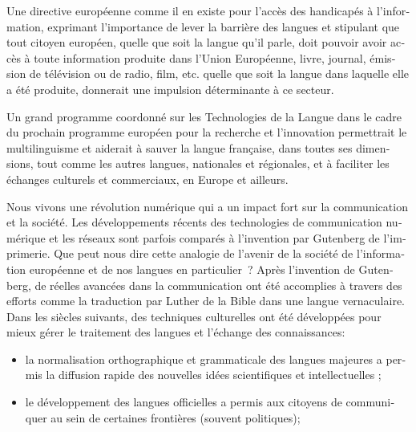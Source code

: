 \begin{french}
\begin{multicols}{2}
Une directive européenne comme il en existe pour l’accès des handicapés à l’information, exprimant l’importance de lever la barrière des langues et stipulant que tout citoyen européen, quelle que soit la langue qu’il parle, doit pouvoir avoir accès à toute information produite dans l’Union Européenne, livre, journal, émission de télévision ou de radio, film, etc. quelle que soit la langue dans laquelle elle a été produite, donnerait une impulsion déterminante à ce secteur.

Un grand programme coordonné sur les Technologies de la Langue dans le cadre du prochain programme européen pour la recherche et l’innovation permettrait le multilinguisme et aiderait à sauver la langue française, dans toutes ses dimensions, tout comme les autres langues, nationales et régionales, et à faciliter les échanges culturels et commerciaux, en Europe et ailleurs.
\end{multicols}

\clearpage


\begin{multicols}{2}

Nous vivons une révolution numérique qui a un impact fort
sur la communication et la société. Les développements récents des
technologies de communication numérique et les réseaux sont parfois
comparés à l'invention par Gutenberg de l'imprimerie. Que peut nous
dire cette analogie de l'avenir de la société de l'information
européenne et de nos langues en particulier~?
Après l'invention de Gutenberg, de réelles avancées dans la
communication ont été accomplies à travers des efforts comme la
traduction par Luther de la Bible dans une langue vernaculaire. Dans
les siècles suivants, des techniques culturelles ont été développées
pour mieux gérer le traitement des langues et l'échange des
connaissances:

\begin{itemize}

\item la normalisation orthographique et grammaticale des langues
  majeures a permis la diffusion rapide des nouvelles idées
  scientifiques et intellectuelles ;

\item le développement des langues officielles a permis aux citoyens
  de communiquer au sein de certaines frontières (souvent politiques);


\end{itemize}
\end{multicols}
\end{french}
